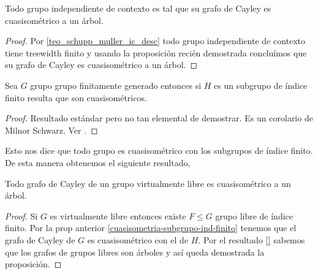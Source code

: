 \documentclass[tesis.tex]{subfiles}
\newcommand{\fg}{grupo finitamente generado }
\begin{document}
\begin{coro}
	Todo grupo independiente de contexto es tal que su grafo de Cayley es cuasisométrico a un árbol.
\end{coro}
\begin{proof}
	Por \ref{teo_schupp_muller_ic_desc} todo grupo independiente de contexto tiene treewidth finito y usando la proposición recién demostrada concluímos que su grafo de Cayley es cuasisométrico a un árbol.
\end{proof}


\begin{prop}\label{cuasisometria-subgrupo-ind-finito}
	Sea $G$ grupo \fg entonces si $H$ es un subgrupo de índice finito resulta que son cuasisométricos.
\end{prop}
\begin{proof}
	Resultado estándar pero no tan elemental de demostrar. 
	Es un corolario de Milnor Schwarz.
	Ver \cite{loh2017geometric}.
\end{proof}

Esto nos dice que todo grupo es cuasisométrico con los subgrupos de índice finito. 
De esta manera obtenemos el siguiente resultado,

\begin{prop}
	Todo grafo de Cayley de un grupo virtualmente libre es cuasisométrico a un árbol.
\end{prop}

\begin{proof}
	Si $G$ es virtualmente libre entonces existe $F \le G$ grupo libre de índice finito.
	Por la prop anterior \ref{cuasisometria-subgrupo-ind-finito} tenemos que el grafo de Cayley de $G$ es cuasisométrico con el de $H$.
	Por el resultado \ref{} sabemos que los grafos de grupos libres son árboles y así queda demostrada la proposición.
\end{proof}
\end{document}
